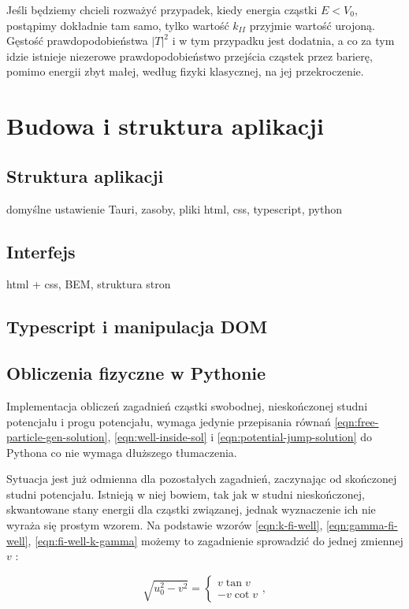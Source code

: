 \documentclass{SGGW-thesis}
\begin{document}
	Jeśli będziemy chcieli rozważyć przypadek, kiedy energia cząstki $E < V_0$, postąpimy dokładnie tam samo, tylko wartość $k_{II}$ przyjmie wartość urojoną. Gęstość prawdopodobieństwa $|T|^2$ i w tym przypadku jest dodatnia, a co za tym idzie istnieje niezerowe prawdopodobieństwo przejścia cząstek przez barierę, pomimo energii zbyt małej, według fizyki klasycznej, na jej przekroczenie.
	
	
\chapter{Budowa i struktura aplikacji}
	\section{Struktura aplikacji}
	domyślne ustawienie Tauri, zasoby, pliki html, css, typescript, python
	\section{Interfejs}
	html + css, BEM, struktura stron
	\section{Typescript i manipulacja DOM}
	\section{Obliczenia fizyczne w Pythonie}
		Implementacja obliczeń zagadnień cząstki swobodnej, nieskończonej studni potencjału i progu potencjału, wymaga jedynie przepisania równań \ref{eqn:free-particle-gen-solution}, \ref{eqn:well-inside-sol} i \ref{eqn:potential-jump-solution} do Pythona co nie wymaga dłuższego tłumaczenia.
		
		Sytuacja jest już odmienna dla pozostałych zagadnień, zaczynając od skończonej studni potencjału. Istnieją w niej bowiem, tak jak w studni nieskończonej, skwantowane stany energii dla cząstki związanej, jednak wyznaczenie ich nie wyraża się prostym wzorem. Na podstawie wzorów \ref{eqn:k-fi-well}, \ref{eqn:gamma-fi-well}, \ref{eqn:fi-well-k-gamma} możemy to zagadnienie sprowadzić do jednej zmiennej $v$ \cite{wikipedia-well}:
		
		\begin{equation}\label{eqn:fi-well-vu}
			\sqrt{u_0^2-v^2} = 
			\left\{
		\begin{matrix}
			v\tan v \\ -v\cot v 
		\end{matrix}\right. ,
		\end{equation}
		
\end{document}
